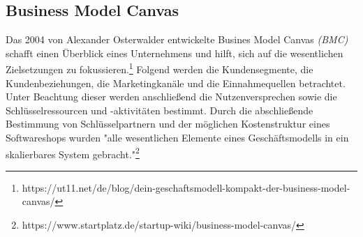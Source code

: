 
\subsection{Business Model Canvas}
Das 2004 von Alexander Osterwalder entwickelte Busines Model Canvas \textit{(BMC)} schafft einen Überblick eines Unternehmens und hilft, sich auf die wesentlichen Zielsetzungen zu fokussieren.\footnote{https://ut11.net/de/blog/dein-geschaftsmodell-kompakt-der-business-model-canvas/} Folgend werden die Kundensegmente, die Kundenbeziehungen, die Marketingkanäle und die Einnahmequellen betrachtet. Unter Beachtung dieser werden anschließend die Nutzenversprechen sowie die Schlüsselressourcen und -aktivitäten bestimmt. Durch die abschließende Bestimmung von Schlüsselpartnern und der möglichen Kostenstruktur eines Softwareshops wurden "alle wesentlichen Elemente eines Geschäftsmodells in ein skalierbares System gebracht."\footnote{https://www.startplatz.de/startup-wiki/business-model-canvas/}

